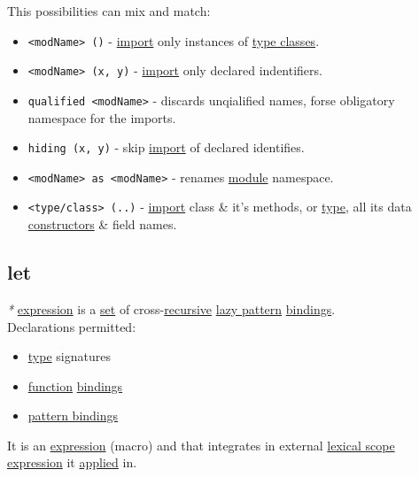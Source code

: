 \documentclass[a4paper,14pt,oneside]{book}
\begin{document}
{This possibilities can mix and match:\\
\begin{itemize}
\item \texttt{<modName> ()} - \hyperref[org7dc0f80]{import} only instances of \hyperref[org547d61d]{type classes}.\\
\item \texttt{<modName> (x, y)} - \hyperref[org7dc0f80]{import} only declared indentifiers.\\
\item \texttt{qualified <modName>} - discards unqialified names, forse obligatory namespace for the imports.\\
\item \texttt{hiding (x, y)} - skip \hyperref[org7dc0f80]{import} of declared identifies.\\
\item \texttt{<modName> as <modName>} - renames \hyperref[org240ade3]{module} namespace.\\
\item \texttt{<type/class> (..)} - \hyperref[org7dc0f80]{import} class \& it's methods, or \hyperref[orga9ca243]{type}, all its data \hyperref[org21599a8]{constructors} \& field names.\\
\end{itemize}

\subsection{\label{orgf53fc41}let}
\label{sec:org9b50f31}
\emph{*} \hyperref[org4f4ad69]{expression} is a \hyperref[org0726f94]{set} of cross-\hyperref[org692ee3f]{recursive} \hyperref[org996aa75]{lazy pattern} \hyperref[orgf35e06d]{bindings}.\\

Declarations permitted:\\
\begin{itemize}
\item \hyperref[orga9ca243]{type} signatures\\
\item \hyperref[org6a60524]{function} \hyperref[orgf35e06d]{bindings}\\
\item \hyperref[org3caf938]{pattern bindings}\\
\end{itemize}

It is an \hyperref[org4f4ad69]{expression} (macro) and that integrates in external \hyperref[orga0e6f8f]{lexical scope} \hyperref[org4f4ad69]{expression} it \hyperref[orgd497efc]{applied} in.\\

}
\end{document}
